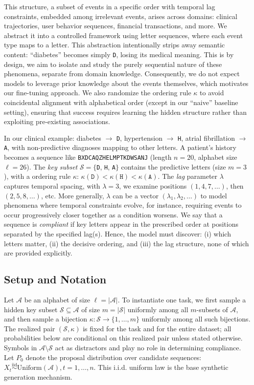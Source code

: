 \documentclass{article}
\theoremstyle{plain}
\theoremstyle{definition}
\theoremstyle{remark}
\begin{document}
This structure, a subset of events in a specific order with temporal lag constraints, embedded among irrelevant events, arises across domains: clinical trajectories, user behavior sequences, financial transactions, and more. We abstract it into a controlled framework using letter sequences, where each event type maps to a letter. This abstraction intentionally strips away semantic content: ``diabetes'' becomes simply \texttt{D}, losing its medical meaning. This is by design, we aim to isolate and study the purely sequential nature of these phenomena, separate from domain knowledge. Consequently, we do not expect models to leverage prior knowledge about the events themselves, which motivates our fine-tuning approach. We also randomize the ordering rule $\kappa$ to avoid coincidental alignment with alphabetical order (except in our ``naive'' baseline setting), ensuring that success requires learning the hidden structure rather than exploiting pre-existing associations.

In our clinical example: diabetes $\to$ \texttt{D}, hypertension $\to$ \texttt{H}, atrial fibrillation $\to$ \texttt{A}, with non-predictive diagnoses mapping to other letters. A patient's history becomes a sequence like \texttt{BXDCAQZHELMPTKDWSANJ} (length $n=20$, alphabet size $\ell=26$). The \emph{key subset} $\mathcal{S} = \{$\texttt{D}, \texttt{H}, \texttt{A}$\}$ contains the predictive letters (size $m=3$), with a ordering rule $\kappa$: $\kappa(\texttt{D})< \kappa(\texttt{H})< \kappa(\texttt{A})$. The \emph{lag} parameter $\lambda$ captures temporal spacing, with $\lambda = 3$, we examine positions $(1, 4, 7, \ldots)$, then $(2, 5, 8, \ldots)$, etc. More generally, $\lambda$ can be a vector $(\lambda_1, \lambda_2, \ldots)$ to model phenomena where temporal constraints evolve, for instance, requiring events to occur progressively closer together as a condition worsens. We say that a sequence is \emph{compliant} if key letters appear in the prescribed order at positions separated by the specified lag(s). Hence, the model must discover: (i) which letters matter, (ii) the decisive ordering, and (iii) the lag structure, none of which are provided explicitly.

\subsection{Setup and Notation}
\label{sec:setup}

Let $\mathcal{A}$ be an alphabet of size $\ell = |\mathcal{A}|$. To instantiate one task, we first sample a hidden key subset $\mathcal{S} \subseteq \mathcal{A}$ of size $m = |\mathcal{S}|$ uniformly among all $m$-subsets of $\mathcal{A}$, and then sample a bijection $\kappa : \mathcal{S} \to \{1,\ldots,m\}$ uniformly among all such bijections. The realized pair $(\mathcal{S},\kappa)$ is fixed for the task and for the entire dataset; all probabilities below are conditional on this realized pair unless stated otherwise. Symbols in $\mathcal{A}\setminus\mathcal{S}$ act as distractors and play no role in determining compliance. Let $P_0$ denote the proposal distribution over candidate sequences: $X_t \stackrel{\mathrm{iid}}{\sim} \mathrm{Uniform}(\mathcal{A}), t=1,\ldots,n.$ This i.i.d. uniform law is the base synthetic generation mechanism.
\end{document}
